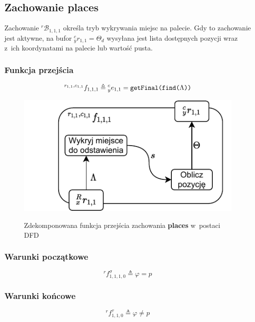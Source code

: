 \subsection{Zachowanie places}
\label{subsec:vr-camera-places}
Zachowanie ${}^{r}\mathcal{B}_{1,1,1}$ określa tryb wykrywania miejsc na palecie. Gdy to zachowanie jest aktywne, na bufor ${}^{c}_{y}r_{1,1} = \Theta_{d}$ wysyłana jest lista dostępnych pozycji wraz z~ich koordynatami na palecie lub wartość pusta. 

\subsubsection{Funkcja przejścia}
\begin{equation}
    {}^{r_{1,1}, c_{1,1}}f_{1,1,1} \triangleq {}^{c}_{y}e_{1,1} = \text{\texttt{getFinal(find(}}\Lambda\text{\texttt{))}}  
\end{equation}

\begin{figure}[ht]
    \centering
    \includegraphics[width=\columnwidth]{figures/ISR-vr-camera-fp-places.pdf}
    \label{fig:vr-camera-fp-places}
    \caption{Zdekomponowana funkcja przejścia zachowania \textbf{places} w~postaci DFD}
\end{figure}

\subsubsection{Warunki początkowe}
\begin{equation}
    {}^{r}f^{\sigma}_{1,1,1,0} \triangleq \varphi = p
\end{equation}

\subsubsection{Warunki końcowe}
\begin{equation}
    {}^{r}f^{\tau}_{1,1,0} \triangleq \varphi \neq p
\end{equation}

